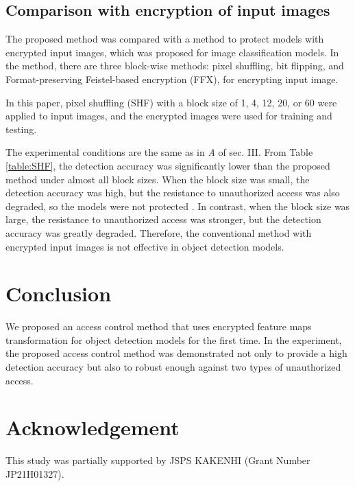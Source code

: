 \documentclass[conference,10pt,a4paper]{IEEEtran}
\begin{document}
\subsection{Comparison with encryption of input images}
 The proposed method was compared with a method to protect models with encrypted input images, which was proposed for image classification models\cite{maungmaung_kiya_2021}. In the method, there are three block-wise methods: pixel shuffling, bit flipping, and Format-preserving Feistel-based encryption (FFX)\cite{bellare2010addendum}, for encrypting
input image. \par
In this paper, pixel shuffling (SHF) with a block size of 1, 4, 12, 20, or 60 were
applied to input images, and the encrypted images were used for training and
testing. \par
 The experimental conditions are the same as in  \textit{A} of sec. III. From Table \ref{table:SHF}, the detection accuracy was significantly lower than the proposed method under
almost all block sizes. When the block size was small, the detection accuracy
was high, but the resistance to unauthorized access was also degraded, so the
models were not protected \cite{maungmaung_kiya_2021}. In contrast, when the block size was large, the
resistance to unauthorized access was stronger, but the detection accuracy was greatly degraded. Therefore, the conventional method with encrypted input images is not effective in object detection models. 
 
\section{Conclusion}
We proposed an access control method that uses encrypted feature maps transformation for object detection models for the first time. In the experiment, the proposed access control method was demonstrated not only to provide a high detection accuracy but also to robust enough against two types of unauthorized access.

\section*{Acknowledgement}
This study was partially supported by JSPS KAKENHI (Grant Number JP21H01327).

\end{document}

